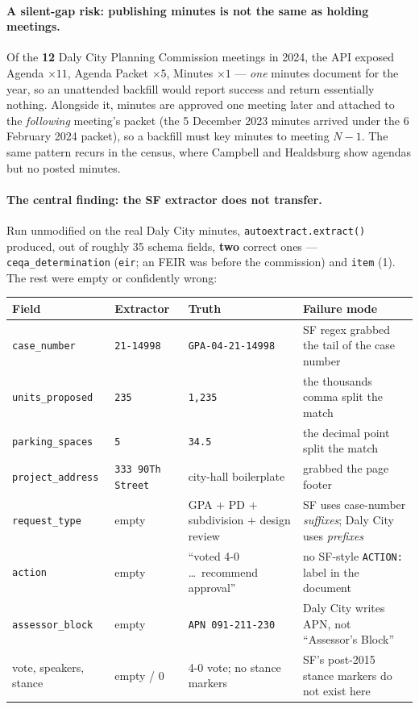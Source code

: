 \documentclass[11pt]{article}
\begin{document}
\paragraph{A silent-gap risk: publishing minutes is not the same as holding meetings.} Of the
\textbf{12} Daly City Planning Commission meetings in 2024, the API exposed Agenda $\times 11$,
Agenda Packet $\times 5$, Minutes $\times 1$ --- \emph{one} minutes document for the year, so an
unattended backfill would report success and return essentially nothing. Alongside it, minutes
are approved one meeting later and attached to the \emph{following} meeting's packet (the 5
December 2023 minutes arrived under the 6 February 2024 packet), so a backfill must key minutes
to meeting $N-1$. The same pattern recurs in the census, where Campbell and Healdsburg show
agendas but no posted minutes.

\paragraph{The central finding: the SF extractor does not transfer.} Run unmodified on the real
Daly City minutes, \texttt{autoextract.extract()} produced, out of roughly 35 schema fields,
\textbf{two} correct ones --- \texttt{ceqa\_determination} (\texttt{eir}; an FEIR was before the
commission) and \texttt{item} (1). The rest were empty or confidently wrong:

\begin{center}
\small
\begin{tabular}{p{} p{} p{} p{}}
\toprule
\textbf{Field} & \textbf{Extractor} & \textbf{Truth} & \textbf{Failure mode} \\
\midrule
\texttt{case\_number} & \texttt{21-14998} & \texttt{GPA-04-21-14998} &
SF regex grabbed the tail of the case number \\
\texttt{units\_proposed} & \texttt{235} & \texttt{1,235} &
the thousands comma split the match \\
\texttt{parking\_spaces} & \texttt{5} & \texttt{34.5} &
the decimal point split the match \\
\texttt{project\_address} & \texttt{333 90Th Street} & city-hall boilerplate &
grabbed the page footer \\
\texttt{request\_type} & empty & GPA $+$ PD $+$ subdivision $+$ design review &
SF uses case-number \emph{suffixes}; Daly City uses \emph{prefixes} \\
\texttt{action} & empty & ``voted 4-0 \dots\ recommend approval'' &
no SF-style \texttt{ACTION:} label in the document \\
\texttt{assessor\_block} & empty & \texttt{APN 091-211-230} &
Daly City writes APN, not ``Assessor's Block'' \\
vote, speakers, stance & empty / 0 & 4-0 vote; no stance markers &
SF's post-2015 stance markers do not exist here \\
\bottomrule
\end{tabular}
\end{center}
\end{document}
